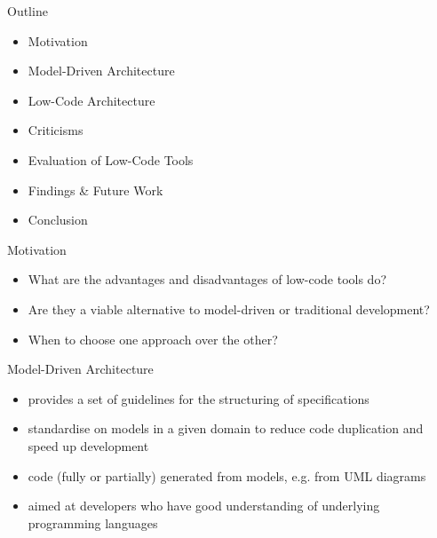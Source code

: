 \documentclass[aspectratio=169]{beamer}
\date{\formatdate{12}{01}{2021}}
\institute{supervised by Prof. Dr. Ruth Breu}
\begin{document}
  \maketitle

  \begin{frame}{Outline}
    \begin{itemize}
      \item Motivation
      \item Model-Driven Architecture
      \item Low-Code Architecture
      \item Criticisms
      \item Evaluation of Low-Code Tools
      \item Findings \& Future Work
      \item Conclusion
    \end{itemize}
  \end{frame}

  \begin{frame}{Motivation}
    \begin{itemize}
      \item What are the advantages and disadvantages of low-code tools do?
      \item Are they a viable alternative to model-driven or traditional development?
      \item When to choose one approach over the other?
    \end{itemize}
  \end{frame}

  \begin{frame}{Model-Driven Architecture}
    \begin{itemize}
      \item provides a set of guidelines for the structuring of specifications
      \item standardise on models in a given domain to reduce code duplication and speed up development
      \item code (fully or partially) generated from models, e.g. from UML diagrams
      \item aimed at developers who have good understanding of underlying programming languages
    \end{itemize}
  \end{frame}
\end{document}
